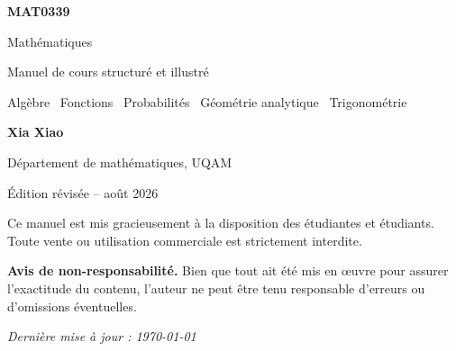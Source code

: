 \documentclass[12pt,a4paper,openany]{book}
\begin{document}
\color{ink}
\frontmatter

\begin{titlepage}
\centering
\vspace*{2.2cm}
{\Huge\sffamily\bfseries\color{navy} MAT0339\par}
\vspace{0.35cm}
{\LARGE\sffamily\color{ink} Mathématiques\par}
\vspace{0.8cm}
{\large\sffamily\color{teal} Manuel de cours structuré et illustré\par}
\vspace{0.35cm}
{\normalsize Algèbre \textbullet\ Fonctions \textbullet\ Probabilités \textbullet\ Géométrie analytique \textbullet\ Trigonométrie\par}
\vspace{1.5cm}
\vfill
{\Large\sffamily\bfseries\color{navy} Xia Xiao\par}
\vspace{0.25cm}
{\large\sffamily\color{slate} Département de mathématiques, UQAM\par}
\vspace{0.8cm}
{\large\sffamily\color{teal} Édition révisée -- août 2026\par}
\end{titlepage}

\thispagestyle{empty}
\vspace*{\fill}
\begin{center}
Ce manuel est mis gracieusement à la disposition des étudiantes et étudiants.\\
Toute vente ou utilisation commerciale est strictement interdite.
\end{center}
\vspace{0.6cm}
\textbf{Avis de non-responsabilité.} Bien que tout ait été mis en œuvre pour assurer l'exactitude du contenu, l'auteur ne peut être tenu responsable d'erreurs ou d'omissions éventuelles.
\vspace{0.6cm}
\begin{center}\textit{Dernière mise à jour : \today}\end{center}
\vspace*{\fill}
\clearpage
\end{document}

